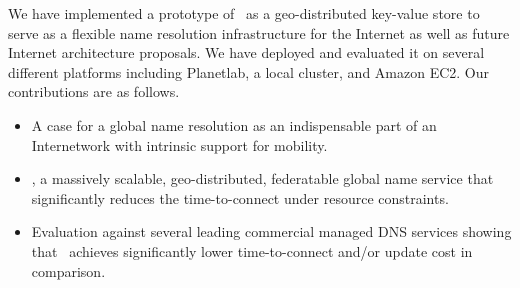 We have implemented a prototype of \auspice\ as a geo-distributed key-value store to serve as a flexible name resolution infrastructure for the Internet as well as future Internet architecture proposals. We have deployed and evaluated it on several different platforms including Planetlab, a local cluster, and Amazon EC2.  Our contributions are as follows.
\begin{itemize}
\item A case for a global name resolution as an indispensable part of an Internetwork with intrinsic support for mobility.
\item \auspice, a massively scalable, geo-distributed, federatable global name service that significantly reduces the time-to-connect under resource constraints. 
\item Evaluation against several leading commercial managed DNS services showing that \auspice\ achieves significantly lower time-to-connect and/or update cost in comparison.
\end{itemize}


